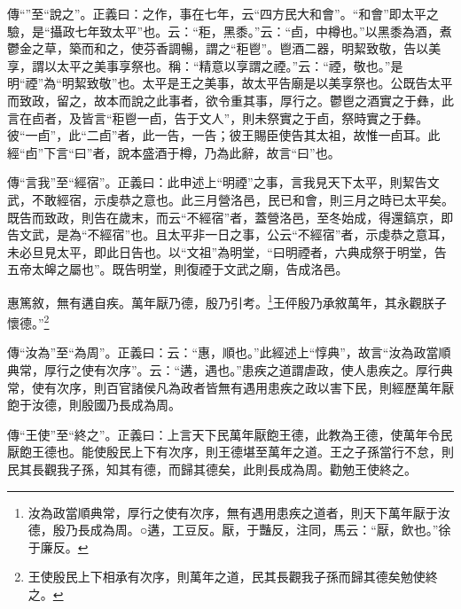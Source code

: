 {\noindent\zhuan{}\fzbyks 傳“”至“說之”。正義曰：之作，事在七年，云“四方民大和會”。“和會”即太平之驗，是“攝政七年致太平”也。云：“秬，黑黍。”云：“卣，中樽也。”以黑黍為酒，煮鬱金之草，築而和之，使芬香調暢，謂之“秬鬯”。鬯酒二器，明絜致敬，告以美享，謂以太平之美事享祭也。稱：“精意以享謂之禋。”云：“禋，敬也。”是明“禋”為“明絜致敬”也。太平是王之美事，故太平告廟是以美享祭也。公既告太平而致政，留之，故本而說之此事者，欲令重其事，厚行之。鬱鬯之酒實之于彝，此言在卣者，及皆言“秬鬯一卣，告于文人”，則未祭實之于卣，祭時實之于彝。彼“一卣”，此“二卣”者，此一告，一告；彼王賜臣使告其太祖，故惟一卣耳。此經“卣”下言“曰”者，說本盛酒于樽，乃為此辭，故言“曰”也。 \par}

{\noindent\zhuan{}\fzbyks 傳“言我”至“經宿”。正義曰：此申述上“明禋”之事，言我見天下太平，則絜告文武，不敢經宿，示虔恭之意也。此三月營洛邑，民已和會，則三月之時已太平矣。既告而致政，則告在歲末，而云“不經宿”者，蓋營洛邑，至冬始成，得還鎬京，即告文武，是為“不經宿”也。且太平非一日之事，公云“不經宿”者，示虔恭之意耳，未必旦見太平，即此日告也。以“文祖”為明堂，“曰明禋者，六典成祭于明堂，告五帝太皞之屬也”。既告明堂，則復禋于文武之廟，告成洛邑。 \par}

惠篤敘，無有遘自疾。萬年厭乃德，殷乃引考。\footnote{汝為政當順典常，厚行之使有次序，無有遇用患疾之道者，則天下萬年厭于汝德，殷乃長成為周。○遘，工豆反。厭，于豔反，注同，馬云：“厭，飲也。”徐于廉反。}王伻殷乃承敘萬年，其永觀朕子懷德。”\footnote{王使殷民上下相承有次序，則萬年之道，民其長觀我子孫而歸其德矣勉使終之。}

{\noindent\zhuan{}\fzbyks 傳“汝為”至“為周”。正義曰：云：“惠，順也。”此經述上“惇典”，故言“汝為政當順典常，厚行之使有次序”。云：“遘，遇也。”患疾之道謂虐政，使人患疾之。厚行典常，使有次序，則百官諸侯凡為政者皆無有遇用患疾之政以害下民，則經歷萬年厭飽于汝德，則殷國乃長成為周。 \par}

{\noindent\zhuan{}\fzbyks 傳“王使”至“終之”。正義曰：上言天下民萬年厭飽王德，此教為王德，使萬年令民厭飽王德也。能使殷民上下有次序，則王德堪至萬年之道。王之子孫當行不怠，則民其長觀我子孫，知其有德，而歸其德矣，此則長成為周。勸勉王使終之。 \par}

